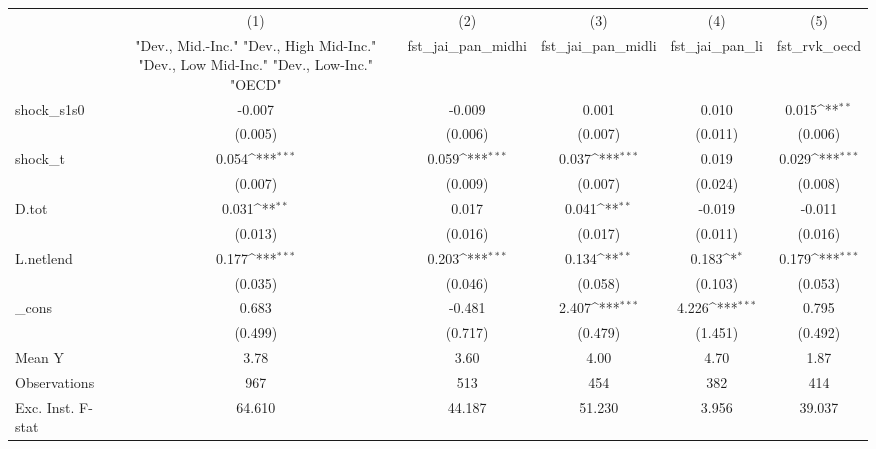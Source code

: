 {
\def\sym#1{\ifmmode^{#1}\else\(^{#1}\)\fi}
\begin{tabular}{l*{5}{c}}
\toprule
            &\multicolumn{1}{c}{(1)}&\multicolumn{1}{c}{(2)}&\multicolumn{1}{c}{(3)}&\multicolumn{1}{c}{(4)}&\multicolumn{1}{c}{(5)}\\
            &\multicolumn{1}{c}{ "Dev., Mid.-Inc." "Dev., High Mid-Inc." "Dev., Low Mid-Inc." "Dev., Low-Inc." "OECD" }&\multicolumn{1}{c}{fst\_jai\_pan\_midhi}&\multicolumn{1}{c}{fst\_jai\_pan\_midli}&\multicolumn{1}{c}{fst\_jai\_pan\_li}&\multicolumn{1}{c}{fst\_rvk\_oecd}\\
\midrule
shock\_s1s0  &      -0.007         &      -0.009         &       0.001         &       0.010         &       0.015\sym{**} \\
            &     (0.005)         &     (0.006)         &     (0.007)         &     (0.011)         &     (0.006)         \\
\addlinespace
shock\_t     &       0.054\sym{***}&       0.059\sym{***}&       0.037\sym{***}&       0.019         &       0.029\sym{***}\\
            &     (0.007)         &     (0.009)         &     (0.007)         &     (0.024)         &     (0.008)         \\
\addlinespace
D.tot       &       0.031\sym{**} &       0.017         &       0.041\sym{**} &      -0.019         &      -0.011         \\
            &     (0.013)         &     (0.016)         &     (0.017)         &     (0.011)         &     (0.016)         \\
\addlinespace
L.netlend   &       0.177\sym{***}&       0.203\sym{***}&       0.134\sym{**} &       0.183\sym{*}  &       0.179\sym{***}\\
            &     (0.035)         &     (0.046)         &     (0.058)         &     (0.103)         &     (0.053)         \\
\addlinespace
\_cons      &       0.683         &      -0.481         &       2.407\sym{***}&       4.226\sym{***}&       0.795         \\
            &     (0.499)         &     (0.717)         &     (0.479)         &     (1.451)         &     (0.492)         \\
\midrule
Mean Y      &        3.78         &        3.60         &        4.00         &        4.70         &        1.87         \\
Observations&         967         &         513         &         454         &         382         &         414         \\
Exc. Inst. F-stat&      64.610         &      44.187         &      51.230         &       3.956         &      39.037         \\
\bottomrule
\end{tabular}
}
